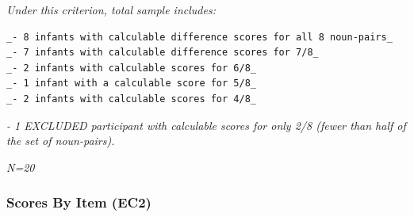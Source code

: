 \documentclass[
  doc,floatsintext]{apa6}
\begin{document}
\emph{Under this criterion, total sample includes:}

\begin{verbatim}
_- 8 infants with calculable difference scores for all 8 noun-pairs_  
_- 7 infants with calculable difference scores for 7/8_    
_- 2 infants with calculable scores for 6/8_  
_- 1 infant with a calculable score for 5/8_    
_- 2 infants with calculable scores for 4/8_    
\end{verbatim}

\emph{- 1 EXCLUDED participant with calculable scores for only 2/8 (fewer than half of the set of noun-pairs).}

\emph{N=20}

\subsubsection{Scores By Item (EC2)}\label{scores-by-item-ec2}
\end{document}
